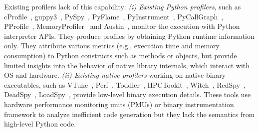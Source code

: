 Existing profilers lack of this capability: %
\emph{(i) Existing Python profilers}, such as cProfile~\cite{cProfile}, guppy3~\cite{guppy3}, PySpy~\cite{py-spy}, PyFlame~\cite{pyflame}, PyInstrument~\cite{pyinstrument}, PyCallGraph~\cite{pycallgraph}, PProfile~\cite{pprofile}, MemoryProfiler~\cite{memoryprofiler} and Austin~\cite{austin}, monitor the execution with Python interpreter APIs. They produce profiles by obtaining Python runtime information only. They attribute various metrics (e.g., execution time and memory consumption) to Python constructs such as methods or objects, but provide limited insights into the behavior of native library internals, which interact with OS and hardware. \emph{(ii) Existing native profilers}  working on native binary executables, such as VTune~\cite{reinders2005vtune}, Perf~\cite{de2010new},
Toddler~\cite{nistor2013toddler}, HPCTookit~\cite{adhianto2010hpctoolkit}, Witch~\cite{wen2018watching}, RedSpy~\cite{wen2017redspy}, DeadSpy~\cite{chabbi2012deadspy}, LoadSpy~\cite{loadspy}, provide low-level binary execution details. These tools use hardware performance monitoring units (PMUs) or binary instrumentation framework to analyze inefficient code generation but they lack the semantics from high-level Python code.




